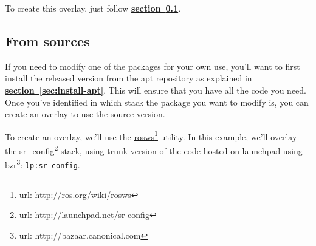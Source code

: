 \documentclass[12pt]{article}
\newcommand{\link}[1]{\hyperref[sec:#1]{\textbf{section~\ref*{sec:#1}}}}
\newcommand{\betterhref}[2]{\href{#1}{#2}\footnote{url: #1}}
\begin{document}
\par To create this overlay, just follow \link{install-src}.

\subsection{From sources}
\label{sec:install-src}
\par If you need to modify one of the packages for your own use, you'll want to first install the released version from the apt repository as explained in \link{install-apt}. This will ensure that you have all the code you need. Once you've identified in which stack the package you want to modify is, you can create an overlay to use the source version.\\

\par To create an overlay, we'll use the \betterhref{http://ros.org/wiki/rosws}{rosws} utility. In this example, we'll overlay the \betterhref{http://launchpad.net/sr-config}{sr\_config} stack, using trunk version of the code hosted on launchpad using \betterhref{http://bazaar.canonical.com}{bzr}: \texttt{lp:sr-config}.
\end{document}
